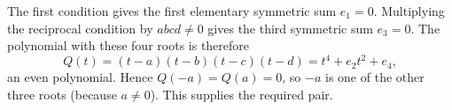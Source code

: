The first condition gives the first elementary symmetric sum $e_1=0$. Multiplying the reciprocal condition by $abcd\ne0$ gives the third symmetric sum $e_3=0$. The polynomial with these four roots is therefore
\[
Q(t)=(t-a)(t-b)(t-c)(t-d)=t^4+e_2t^2+e_4,
\]
an even polynomial. Hence $Q(-a)=Q(a)=0$, so $-a$ is one of the other three roots (because $a\ne0$). This supplies the required pair.
